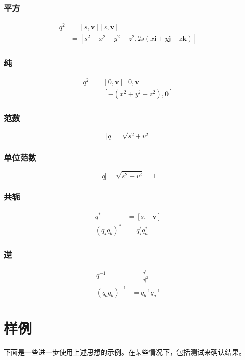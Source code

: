 \subsubsection*{平方}
$$
\begin{aligned}
q^{2} & =[s, \mathbf{v}][s, \mathbf{v}] \\
& =\left[s^{2}-x^{2}-y^{2}-z^{2}, 2 s(x \mathbf{i}+y \mathbf{j}+z \mathbf{k})\right]
\end{aligned}
$$

\subsubsection*{纯}
$$
\begin{aligned}
q^{2} & =[0, \mathbf{v}][0, \mathbf{v}] \\
& =\left[-\left(x^{2}+y^{2}+z^{2}\right), \mathbf{0}\right]
\end{aligned}
$$

\subsubsection*{范数}
$$
|q|=\sqrt{s^{2}+v^{2}}
$$

\subsubsection*{单位范数}
$$
|q|=\sqrt{s^{2}+v^{2}}=1
$$

\subsubsection*{共轭}
$$
\begin{aligned}
q^{*} & =[s,-\mathbf{v}] \\
\left(q_{a} q_{b}\right)^{*} & =q_{b}^{*} q_{a}^{*}
\end{aligned}
$$

\subsubsection*{逆}
$$
\begin{aligned}
q^{-1} & =\frac{q^{*}}{|q|^{2}} \\
\left(q_{a} q_{b}\right)^{-1} & =q_{b}^{-1} q_{a}^{-1}
\end{aligned}
$$

\section{样例}
下面是一些进一步使用上述思想的示例。在某些情况下，包括测试来确认结果。

